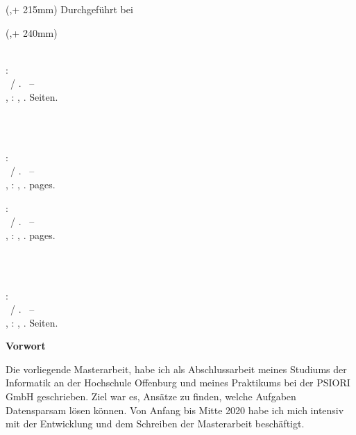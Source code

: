 \begin{textblock*}{\seitenbreite}(\bindekorrektur,\seitenanfang + 215mm)
  \centering\large 
  \textsf{Durchgeführt bei \hsmafirma}
\end{textblock*}

\begin{textblock*}{\seitenbreite}(\bindekorrektur,\seitenanfang + 240mm)
  \centering\large\sffamily
  \hsmatutor \\
  \vspace{2mm}
  \hsmabetreuer\\
  \vspace{2mm}
  \hsmazweitkorrektor
\end{textblock*}

\null\newpage
\thispagestyle{empty}
  
\newcommand{\hsmabibde}{\begin{small}\textbf{\hsmaautorbib}: \\ \hsmatitelde \ / \hsmaautor. \ -- \\ \hsmatypde, \hsmaort : \hsmakoerperschaftde, \hsmajahr. \pageref{lastpage} Seiten.\end{small}}

\newcommand{\hsmabiben}{\begin{small}\textbf{\hsmaautorbib}: \\ \hsmatitelen \ / \hsmaautor. \ -- \\ \hsmatypen, \hsmaort : \hsmakoerperschaften, \hsmajahr. \pageref{lastpage} pages. \end{small}}

%
  {\hsmabibde \\ \vspace{0.5cm} \\ \hsmabiben}
  {\hsmabiben \\ \vspace{0.5cm} \\ \hsmabibde}


\clearpage\setcounter{page}{1}
\thispagestyle{empty}
\textsf{\large\textbf{Vorwort}}

Die vorliegende Masterarbeit, habe ich als Abschlussarbeit meines Studiums der Informatik an der Hochschule Offenburg und meines Praktikums bei der PSIORI GmbH geschrieben. Ziel war es, Ansätze zu finden, welche Aufgaben Datensparsam lösen können. Von Anfang bis Mitte 2020 habe ich mich intensiv mit der Entwicklung und dem Schreiben der Masterarbeit beschäftigt.

